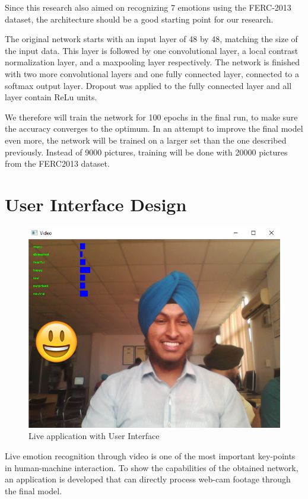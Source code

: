 Since this research also aimed on recognizing 7 emotions using the FERC-2013 dataset, the architecture should be a good starting point for our research.

The original network starts with an input layer of 48 by 48, matching the size of the input data. This layer is followed by one convolutional layer, a local contrast normalization layer, and a maxpooling layer respectively. The network is finished with two more convolutional layers and one fully connected layer, connected to a softmax output layer. Dropout was applied to the fully connected layer and all layer contain ReLu units.

We therefore will train the network for 100 epochs in the final run, to make sure the accuracy converges to the optimum. In an attempt to improve the final model even more, the network will be trained on a larger set than the one described previously. Instead of 9000 pictures, training will be done with 20000 pictures from the FERC2013 dataset.

\section{User Interface Design}
\begin{figure}[h]
	\centering\includegraphics[scale=0.75]{images/ui.png}
	\caption{Live application with User Interface}
\end{figure}

Live emotion recognition through video is one of the most important key-points in human-machine interaction. To show the capabilities of the obtained network, an application is developed that can directly process web-cam footage through the final model.

